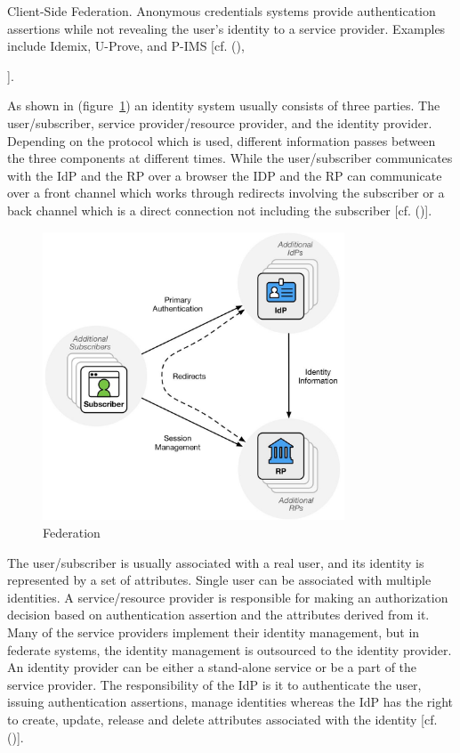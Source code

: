 Client-Side Federation. Anonymous credentials systems provide authentication assertions while not revealing the user's identity to a service provider. Examples include Idemix, U-Prove, and P-IMS [cf. (\cite{Birell:2013:FIMS}), {\cite{Boyed:2012:GSOA}].
	
	
	As shown in (figure~\ref{fig:federation}) an identity system usually consists of three parties. The user/subscriber, service provider/resource provider, and the identity provider. Depending on the protocol which is used, different information passes between the three components at different times. While the user/subscriber communicates with the IdP and the RP over a browser the IDP and the RP can communicate over a front channel which works through redirects involving the subscriber or a back channel which is a direct connection not including the subscriber [cf. (\cite{NIST:2017:DIGFA})]. 
	\begin{figure}[h]
		\centering
		\includegraphics[width=0.8\textwidth]{images/federation}
		\caption[Federation]{Federation}
		\label{fig:federation}
	\end{figure}
	
	
	The user/subscriber is usually associated with a real user, and its identity is represented by a set of attributes. Single user can be associated with multiple identities. A service/resource provider is responsible for making an authorization decision based on authentication assertion and the attributes derived from it. Many of the service providers implement their identity management, but in federate systems, the identity management is outsourced to the identity provider. An identity provider can be either a stand-alone service or be a part of the service provider. The responsibility of the IdP is it to authenticate the user, issuing authentication assertions, manage identities whereas the IdP has the right to create, update, release and delete attributes associated with the identity [cf. (\cite{Birell:2013:FIMS})]. 
	
}
